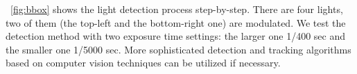 ~\autoref{fig:bbox} shows the light detection process step-by-step. There are four lights, two of them (the top-left and the bottom-right one) are modulated. We test the detection method with two exposure time settings: the larger one 1/400 sec and the smaller one 1/5000 sec.
More sophisticated detection and tracking algorithms based on computer vision techniques can be utilized if necessary.




